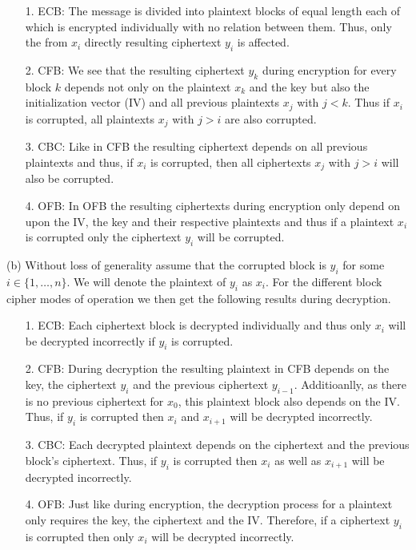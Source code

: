 \documentclass[11pt]{article}
\begin{document}
\begin{itemize}
    \item[1.] ECB: The message is divided into plaintext blocks of equal length each of which is encrypted individually with no relation between them. Thus, only the from $x_i$ directly resulting ciphertext $y_i$ is affected.
    \item[2.] CFB: We see that the resulting ciphertext $y_k$ during encryption for every block $k$ depends not only on the plaintext $x_k$ and the key but also the initialization vector (IV) and all previous plaintexts $x_j$ with $j<k$. Thus if $x_i$ is corrupted, all plaintexts $x_j$ with $j>i$ are also corrupted.
    \item[3.] CBC: Like in CFB the resulting ciphertext depends on all previous plaintexts and thus, if $x_i$ is corrupted, then all ciphertexts $x_j$ with $j>i$ will also be corrupted.
    \item[4.] OFB: In OFB the resulting ciphertexts during encryption only depend on upon the IV, the key and their respective plaintexts and thus if a plaintext $x_i$ is corrupted only the ciphertext $y_i$ will be corrupted.
\end{itemize}

\noindent (b) Without loss of generality assume that the corrupted block is $y_i$ for some $i \in \{1, \ldots, n\}$. We will denote the plaintext of $y_i$ as $x_i$. For the different block cipher modes of operation we then get the following results during decryption.

\begin{itemize}
    \item[1.] ECB: Each ciphertext block is decrypted individually and thus only $x_i$ will be decrypted incorrectly if $y_i$ is corrupted.
    \item[2.] CFB: During decryption the resulting plaintext in CFB depends on the key, the ciphertext $y_i$ and the previous ciphertext $y_{i-1}$. Additioanlly, as there is no previous ciphertext for $x_0$, this plaintext block also depends on the IV. Thus, if $y_i$ is corrupted then $x_i$ and $x_{i+1}$ will be decrypted incorrectly.
    \item[3.] CBC: Each decrypted plaintext depends on the ciphertext and the previous block's ciphertext. Thus, if $y_i$ is corrupted then $x_i$ as well as $x_{i+1}$ will be decrypted incorrectly.
    \item[4.] OFB: Just like during encryption, the decryption process for a plaintext only requires the key, the ciphertext and the IV. Therefore, if a ciphertext $y_i$ is corrupted then only $x_i$ will be decrypted incorrectly.
\end{itemize} 
\end{document}
